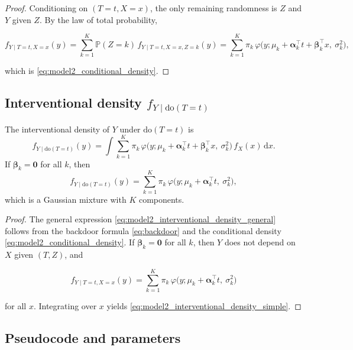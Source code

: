 \documentclass[11pt]{article}
\begin{document}
\begin{proof}
Conditioning on $(T=t,X=x)$, the only remaining randomness is $Z$ and $Y$ given $Z$.
By the law of total probability,


\[
f_{Y \mid T=t,X=x}(y)
= \sum_{k=1}^K \mathbb{P}(Z=k)\, f_{Y \mid T=t,X=x,Z=k}(y)
= \sum_{k=1}^K \pi_k\, \varphi\big(y;\mu_k + \bm{\alpha}_k^\top t + \bm{\beta}_k^\top x,\ \sigma_k^2\big),
\]


which is \eqref{eq:model2_conditional_density}.
\end{proof}

\subsection{Interventional density $f_{Y \mid \mathrm{do}(T=t)}$}

\begin{theorem}
The interventional density of $Y$ under $\mathrm{do}(T=t)$ is
\begin{equation}
    f_{Y \mid \mathrm{do}(T=t)}(y)
    = \int \sum_{k=1}^K \pi_k\, \varphi\big(y;\mu_k + \bm{\alpha}_k^\top t + \bm{\beta}_k^\top x,\ \sigma_k^2\big)\,
      f_X(x)\, \mathrm{d}x.
    \label{eq:model2_interventional_density_general}
\end{equation}
If $\bm{\beta}_k = \bm{0}$ for all $k$, then
\begin{equation}
    f_{Y \mid \mathrm{do}(T=t)}(y)
    = \sum_{k=1}^K \pi_k\, \varphi\big(y;\mu_k + \bm{\alpha}_k^\top t,\ \sigma_k^2\big),
    \label{eq:model2_interventional_density_simple}
\end{equation}
which is a Gaussian mixture with $K$ components.
\end{theorem}

\begin{proof}
The general expression \eqref{eq:model2_interventional_density_general} follows from the backdoor formula \eqref{eq:backdoor} and the conditional density \eqref{eq:model2_conditional_density}.
If $\bm{\beta}_k = \bm{0}$ for all $k$, then $Y$ does not depend on $X$ given $(T,Z)$, and


\[
f_{Y \mid T=t,X=x}(y)
= \sum_{k=1}^K \pi_k\, \varphi\big(y;\mu_k + \bm{\alpha}_k^\top t,\ \sigma_k^2\big)
\]


for all $x$.
Integrating over $x$ yields \eqref{eq:model2_interventional_density_simple}.
\end{proof}

\subsection{Pseudocode and parameters}
\end{document}
